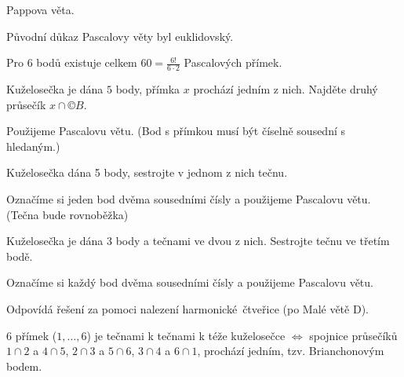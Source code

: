 \documentclass[12pt]{article}					%
\begin{document}
\begin{dusledek}
	Pappova věta.
\end{dusledek}

\begin{poznamka}[Historická]
	Původní důkaz Pascalovy věty byl euklidovský.
\end{poznamka}

\begin{poznamka}
	Pro $6$ bodů existuje celkem $60 = \frac{6!}{6·2}$ Pascalových přímek.
\end{poznamka}

\begin{priklad}[Konstrukce]
	Kuželosečka je dána $5$ body, přímka $x$ prochází jedním z nich. Najděte druhý průsečík $x \cap ©B$.

	\begin{reseni}
		Použijeme Pascalovu větu. (Bod s přímkou musí být číselně sousední s hledaným.)
	\end{reseni}
\end{priklad}

\begin{priklad}[Konstrukce]
	Kuželosečka dána 5 body, sestrojte v jednom z nich tečnu.

	\begin{reseni}
		Označíme si jeden bod dvěma sousedními čísly a použijeme Pascalovu větu. (Tečna bude rovnoběžka)
	\end{reseni}
\end{priklad}

\begin{priklad}[Konstrukce]
	Kuželosečka je dána 3 body a tečnami ve dvou z nich. Sestrojte tečnu ve třetím bodě.

	\begin{reseni}
		Označíme si každý bod dvěma sousedními čísly a použijeme Pascalovu větu.
	\end{reseni}

	\begin{poznamkain}
		Odpovídá řešení za pomoci nalezení harmonické čtveřice (po Malé větě D).
	\end{poznamkain}
\end{priklad}

\begin{veta}
	6 přímek ($1, …, 6$) je tečnami k tečnami k téže kuželosečce $\Leftrightarrow$ spojnice průsečíků $1 \cap 2$ a $4 \cap 5$, $2 \cap 3$ a $5 \cap 6$, $3 \cap 4$ a $6 \cap 1$, prochází jedním, tzv. Brianchonovým bodem.
\end{veta}
\end{document}
